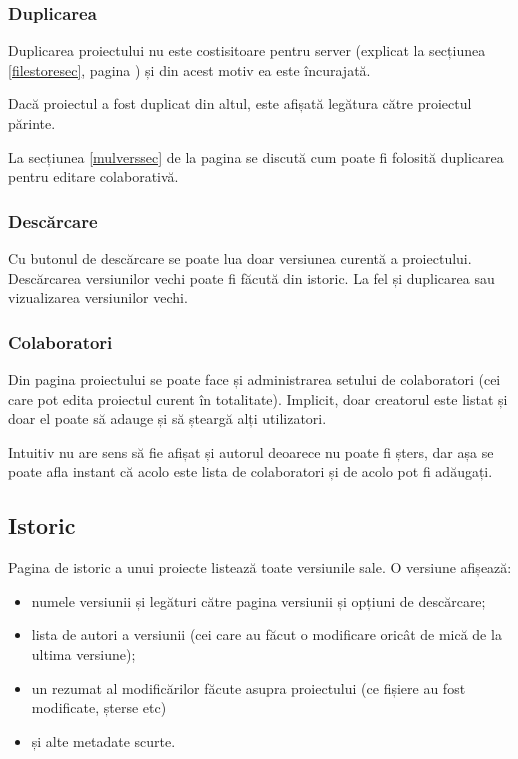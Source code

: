 \documentclass[a4wide,12pt]{report}
\begin{document}
\subsubsection{Duplicarea}

Duplicarea proiectului nu este costisitoare pentru server (explicat la secțiunea
\ref{filestoresec}, pagina \pageref{filestoresec}) și din acest motiv ea este
încurajată.

Dacă proiectul a fost duplicat din altul, este afișată legătura către proiectul
părinte.

La secțiunea \ref{mulverssec} de la pagina \pageref{mulverssec} se discută cum
poate fi folosită duplicarea pentru editare colaborativă.

\subsubsection{Descărcare}

Cu butonul de descărcare se poate lua doar versiunea curentă a proiectului.
Descărcarea versiunilor vechi poate fi făcută din istoric. La fel și duplicarea
sau vizualizarea versiunilor vechi.

\subsubsection{Colaboratori}

Din pagina proiectului se poate face și administrarea setului de colaboratori
(cei care pot edita proiectul curent în totalitate). Implicit, doar creatorul
este listat și doar el poate să adauge și să șteargă alți utilizatori.

Intuitiv nu are sens să fie afișat și autorul deoarece nu poate fi șters, dar
așa se poate afla instant că acolo este lista de colaboratori și de acolo pot fi
adăugați.

\subsection{Istoric}

Pagina de istoric a unui proiecte listează toate versiunile sale. O versiune
afișează:

\begin{itemize}

\item numele versiunii și legături către pagina versiunii și opțiuni de
descărcare;

\item lista de autori a versiunii (cei care au făcut o modificare oricât de mică
de la ultima versiune);

\item un rezumat al modificărilor făcute asupra proiectului (ce fișiere au fost
modificate, șterse etc)

\item și alte metadate scurte.

\end{itemize}
\end{document}

